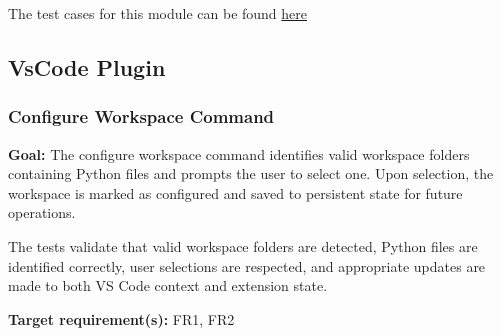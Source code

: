 \documentclass[12pt, titlepage]{article}
\begin{document}
  \noindent The test cases for this module can be found
  \href{https://github.com/ssm-lab/capstone--source-code-optimizer/blob/main/tests/refactorers/test_long_lambda_element_refactoring.py}{here}





\subsection{VsCode Plugin}

\subsubsection{Configure Workspace Command}

\textbf{Goal:} The configure workspace command identifies valid workspace folders containing Python files and prompts the user to select one. Upon selection, the workspace is marked as configured and saved to persistent state for future operations.

\medskip

\noindent The tests validate that valid workspace folders are detected, Python files are identified correctly, user selections are respected, and appropriate updates are made to both VS Code context and extension state.

\medskip

\noindent\textbf{Target requirement(s):} FR1, FR2~\cite{SRS}
\end{document}
